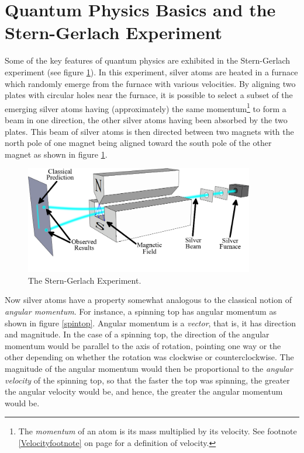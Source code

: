 \section{Quantum Physics Basics and the Stern-Gerlach Experiment}
Some of the key features of quantum physics are exhibited in the Stern-Gerlach experiment (see figure \ref{stern}).
In this experiment, silver atoms are heated in a furnace which randomly emerge from the furnace with various velocities. By aligning two plates with circular holes near the furnace, it is possible to select a subset of the emerging silver atoms having (approximately) the same momentum\footnote{The \emph{momentum} of an atom is its mass multiplied by its velocity. See footnote \ref{Velocityfootnote} on page \pageref{Velocityfootnote} for a definition of velocity.} to form a beam in one direction, the other silver atoms having been absorbed by the two plates. This beam of silver atoms is then directed between two magnets with the north pole of one magnet being aligned toward the south pole of the other magnet as shown in figure \ref{stern}.
\begin{figure}[ht!]
\captionsetup{justification=justified}
\centering
\includegraphics[width=100mm]{Chapter01/Stern-Gerlach_experiment_svg.png}
\caption[Stern-Gerlach Experiment]{The Stern-Gerlach Experiment.\protect\footnotemark}
\label{stern}
\end{figure}
Now silver atoms have a property somewhat analogous to the classical notion of \emph{angular momentum}. For instance, a spinning top has angular momentum as shown in figure \ref{spintop}. Angular momentum is a \emph{vector}, that is, it has direction and magnitude. In the case of a spinning top, the direction of the angular momentum would be parallel to the axis of rotation, pointing one way or the other depending on whether the rotation was clockwise or counterclockwise. The magnitude of the angular momentum would then be proportional to the \emph{angular velocity} of the spinning top, so that the faster the top was spinning, the greater the angular velocity would be, and hence, the greater the angular momentum would be.

